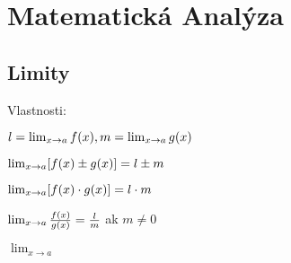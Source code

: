 \section{Matematická Analýza}

\subsection{Limity}
Vlastnosti:

\begin{mathblock2col}
    
  
  \par$ l = \lim_{x\to a} f(x), m = \lim_{x\to a} g(x) $
  \par$ \lim_{x\to a}[f(x)\pm g(x)] = l \pm m $
  \par$ \lim_{x\to a}[f(x) \cdot g(x)] = l \cdot m $
  \par$ \lim_{x\to a}\frac{f(x)}{g(x)} = \frac{l}{m}$ {\small ak} $m\neq 0 $
  
  \columnbreak
  \par$ \lim_{x\to{a}} $
\end{mathblock2col}